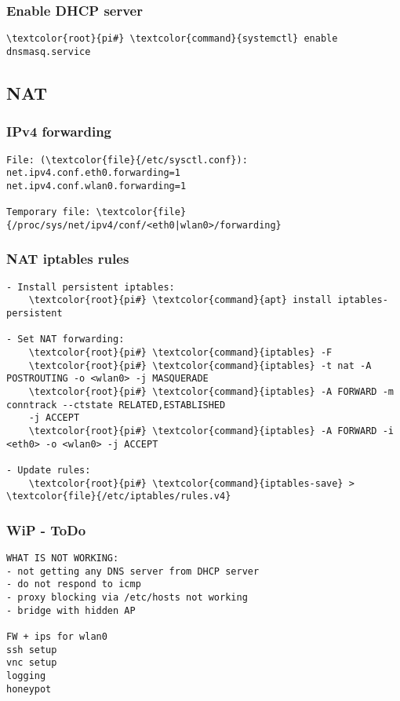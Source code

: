 \documentclass[10pt, a4paper, onecolumn, openany]{book} %
\begin{document}
\subsubsection{Enable DHCP server}
\begin{Verbatim}[commandchars=\\\{\}]
    \textcolor{root}{pi#} \textcolor{command}{systemctl} enable dnsmasq.service
\end{Verbatim}

\subsection{NAT}
\subsubsection{IPv4 forwarding}
\begin{Verbatim}[commandchars=\\\{\}]
File: (\textcolor{file}{/etc/sysctl.conf}):
net.ipv4.conf.eth0.forwarding=1
net.ipv4.conf.wlan0.forwarding=1

Temporary file: \textcolor{file}{/proc/sys/net/ipv4/conf/<eth0|wlan0>/forwarding}
\end{Verbatim}

\subsubsection{NAT iptables rules}
\begin{Verbatim}[commandchars=\\\{\}]
- Install persistent iptables:
    \textcolor{root}{pi#} \textcolor{command}{apt} install iptables-persistent

- Set NAT forwarding:
    \textcolor{root}{pi#} \textcolor{command}{iptables} -F
    \textcolor{root}{pi#} \textcolor{command}{iptables} -t nat -A POSTROUTING -o <wlan0> -j MASQUERADE
    \textcolor{root}{pi#} \textcolor{command}{iptables} -A FORWARD -m conntrack --ctstate RELATED,ESTABLISHED
    -j ACCEPT
    \textcolor{root}{pi#} \textcolor{command}{iptables} -A FORWARD -i <eth0> -o <wlan0> -j ACCEPT

- Update rules:
    \textcolor{root}{pi#} \textcolor{command}{iptables-save} > \textcolor{file}{/etc/iptables/rules.v4}
\end{Verbatim}

\subsubsection{WiP - ToDo}
\begin{Verbatim}[commandchars=\\\{\}]
WHAT IS NOT WORKING:
- not getting any DNS server from DHCP server
- do not respond to icmp
- proxy blocking via /etc/hosts not working
- bridge with hidden AP

FW + ips for wlan0
ssh setup 
vnc setup
logging
honeypot
\end{Verbatim}
\end{document}
